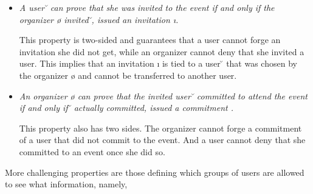 \begin{itemize}
	
	\item \textit{A user \u{} can prove that she was invited to the
					event \e{} if and only if the organizer
					\o{} invited \u{}, \ie issued an
					invitation \i{}.} 

	This property is two-sided and guarantees that a user cannot forge
	an invitation she did not get, while an organizer cannot deny that
	she invited a user. 
	This implies that an invitation \i{} is tied to a user \u{} that was
	chosen by the organizer \o{} and cannot be transferred to another user.\\

	
	\item \textit{An organizer \o{} can prove that the invited 
		user \u{} committed to attend the event \e{} if and only if \u{}
		actually committed, \ie issued a commitment \cm{}.}

	This property also has two sides. The organizer cannot forge a commitment
	of a user that did not commit to the event. And a user cannot deny
	that she committed to an event once she did so.

\end{itemize}

\noindent More challenging properties are those defining which groups of
users are allowed to see what information, namely, 

